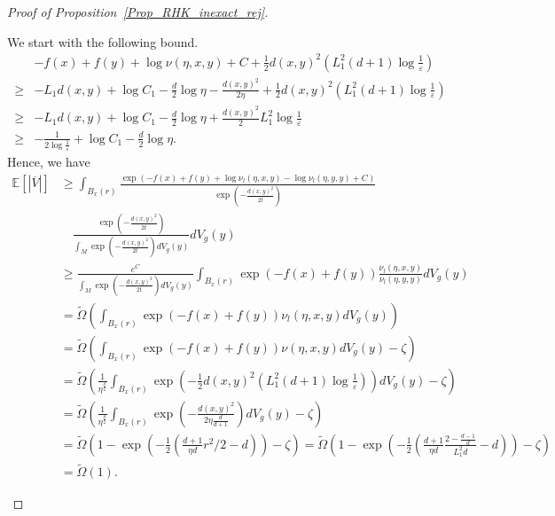 \begin{proof}[Proof of Proposition~\ref{Prop_RHK_inexact_rej}]
\begin{enumerate}
        We start with the following bound.
        \begin{align*}
                &-f(x) + f(y) + \log \nu(\eta, x, y) + C + \frac{1}{2}d(x, y)^{2}(L_{1}^{2}(d+1)\log \frac{1}{\varepsilon})\\
                \ge& -L_{1}d(x, y) + \log C_{1} - \frac{d}{2}\log \eta -\frac{d(x, y)^{2}}{2\eta} + \frac{1}{2}d(x, y)^{2}(L_{1}^{2}(d+1)\log \frac{1}{\varepsilon}) \\
                \ge& -L_{1}d(x, y) + \log C_{1} - \frac{d}{2}\log \eta + \frac{d(x, y)^{2}}{2}L_{1}^{2} \log \frac{1}{\varepsilon} \\
                \ge& -\frac{1}{2\log \frac{1}{\varepsilon}} + \log C_{1} - \frac{d}{2}\log \eta.
        \end{align*}
        Hence, we have
        \begin{align*}
                \mathbb{E}[|\overline{V}|]
                &\ge 
                \int_{B_{x}(r)}\frac{\exp(-f(x)+f(y)+\log \nu_{l}(\eta, x, y) - \log \nu_{l}(\eta, y, y) + C)}{\exp(-\frac{d(x, y)^{2}}{2t})}\\
                &\quad \frac{\exp(-\frac{d(x, y)^{2}}{2t})}{\int_{M}\exp(-\frac{d(x, y)^{2}}{2t})dV_{g}(y)} dV_{g}(y) \\
                &\ge \frac{e^{C}}{\int_{M}\exp(-\frac{d(x, y)^{2}}{2t})dV_{g}(y)}
                \int_{B_{x}(r)}\exp(-f(x)+f(y))\frac{\nu_{l}(\eta, x, y)}{\nu_{l}(\eta, y, y)} dV_{g}(y) \\
                &= \tilde{\Omega} (
                \int_{B_{x}(r)}\exp(-f(x)+f(y))\nu_{l}(\eta, x, y) dV_{g}(y)) \\
                &= \tilde{\Omega} (\int_{B_{x}(r)}\exp(-f(x)+f(y))\nu(\eta, x, y) dV_{g}(y) - \zeta)\\
                &= \tilde{\Omega} (\frac{1}{\eta^{\frac{d}{2}}}\int_{B_{x}(r)}\exp(-\frac{1}{2}d(x, y)^{2}(L_{1}^{2}(d+1)\log \frac{1}{\varepsilon})) dV_{g}(y) - \zeta)\\
                &= \tilde{\Omega} (\frac{1}{\eta^{\frac{d}{2}}}\int_{B_{x}(r)}\exp(-\frac{d(x, y)^{2}}{2\eta\frac{d}{d+1}}) dV_{g}(y) - \zeta)\\
                &= \tilde{\Omega} (1 - \exp(-\frac{1}{2}( \frac{d+1}{\eta d} r^{2}/2 - d)) - \zeta)
                = \tilde{\Omega} (1 - \exp(-\frac{1}{2}( \frac{d+1}{\eta d} \frac{2-\frac{d-1}{d}}{L_{1}^{2} d} - d)) - \zeta)\\
                &= \tilde{\Omega} (1).
        \end{align*}
    

\end{enumerate}
\end{proof}

